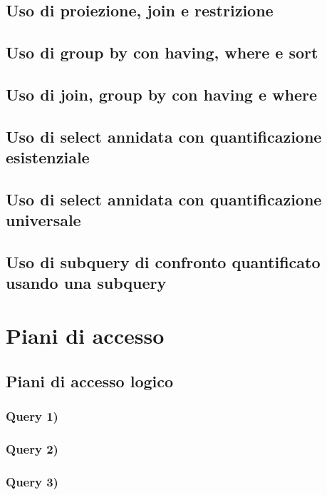 \documentclass[a4paper,12pt]{article}
\begin{document}
 \subsection{ Uso di proiezione, join e restrizione }
 \subsection{ Uso di group by con having, where e sort }
 \subsection{ Uso di join, group by con having e where }
 \subsection{ Uso di select annidata con quantificazione esistenziale }
 \subsection{ Uso di select annidata con quantificazione universale }
 \subsection{ Uso di subquery di confronto quantificato usando una subquery }



 \section{ Piani di accesso }

 \subsection{ Piani di accesso logico }

 \subsubsection{ Query 1) }

 \subsubsection{ Query 2) }

 \subsubsection{ Query 3) }
\end{document}
